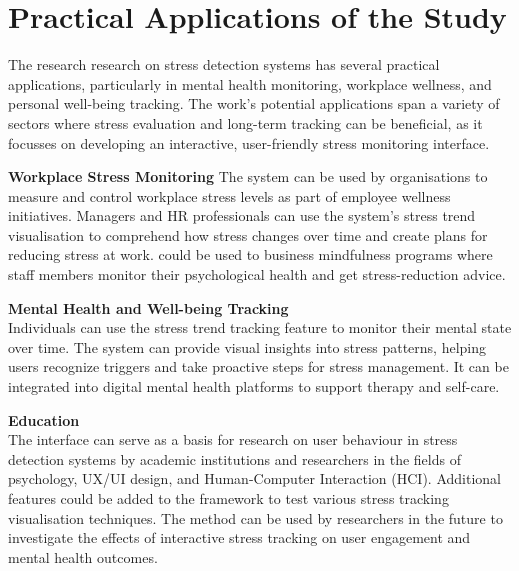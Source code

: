 \documentclass[Arial,12pt,openright,twoside]{book}
\begin{document}
 \section{Practical Applications of the Study}
 The research research on stress detection systems has several practical applications, particularly in mental health monitoring, workplace wellness, and personal well-being tracking. The work's potential applications span a variety of sectors where stress evaluation and long-term tracking can be beneficial, as it focusses on developing an interactive, user-friendly stress monitoring interface.
\begin{flushleft}
\textbf{ Workplace Stress Monitoring} 
\justifying
The system can be used by organisations to measure and control workplace stress levels as part of employee wellness initiatives. Managers and HR professionals can use the system's stress trend visualisation to comprehend how stress changes over time and create plans for reducing stress at work. could be used to business mindfulness programs where staff members monitor their psychological health and get stress-reduction advice.
 \end{flushleft}
  \begin{flushleft}
\textbf{Mental Health and Well-being Tracking} \\
\justifying
Individuals can use the stress trend tracking feature to monitor their mental state over time. The system can provide visual insights into stress patterns, helping users recognize triggers and take proactive steps for stress management. It can be integrated into digital mental health platforms to support therapy and self-care.
 \end{flushleft}
 \begin{flushleft}
\textbf{Education} \\
\justifying
The interface can serve as a basis for research on user behaviour in stress detection systems by academic institutions and researchers in the fields of psychology, UX/UI design, and Human-Computer Interaction (HCI). Additional features could be added to the framework to test various stress tracking visualisation techniques. The method can be used by researchers in the future to investigate the effects of interactive stress tracking on user engagement and mental health outcomes.
 \end{flushleft}
\end{document}
